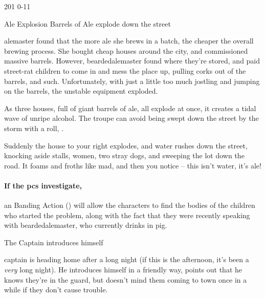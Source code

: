 %
  {{2}{0}{1}}%
  {{0}{-1}{1}}%
  {%
    \longsword
    \completeplate
  }%
  {}%
  {\lootMedium}%
  {}%

{Ale Explosion}%
{Barrels of Ale explode down the street}%

\Gls{alemaster} found that the more ale she brews in a batch, the cheaper the overall brewing process.
She bought cheap houses around the city, and commissioned massive barrels.
However, \gls{beardedalemaster} found where they're stored, and paid street-rat children to come in and mess the place up, pulling corks out of the barrels, and such.
Unfortunately, with just a little too much jostling and jumping on the barrels, the unstable equipment exploded.

As three houses, full of giant barrels of ale, all explode at once, it creates a tidal wave of unripe alcohol.
The troupe can avoid being swept down the street by the storm with a  roll, \tn[8].

\begin{boxtext}
  Suddenly the house to your right explodes, and water rushes down the street, knocking aside stalls, women, two stray dogs, and sweeping the lot down the road.  It foams and froths like mad, and then you notice -- this isn't water, it's ale!
\end{boxtext}

\paragraph{If the \glspl{pc} investigate,}
an  Banding Action (\tn[10]) will allow the characters to find the bodies of the children who started the problem, along with the fact that they were recently speaking with \gls{beardedalemaster}, who currently drinks in \gls{pig}.%

{\squash The Captain}%
{ introduces himself}%

\Gls{captain} is heading home after a long night (if this is the afternoon, it's been a \emph{very} long night).
He introduces himself in a friendly way, points out that he knows they're in the \gls{guard}, but doesn't mind them coming to town once in a while if they don't cause trouble.

